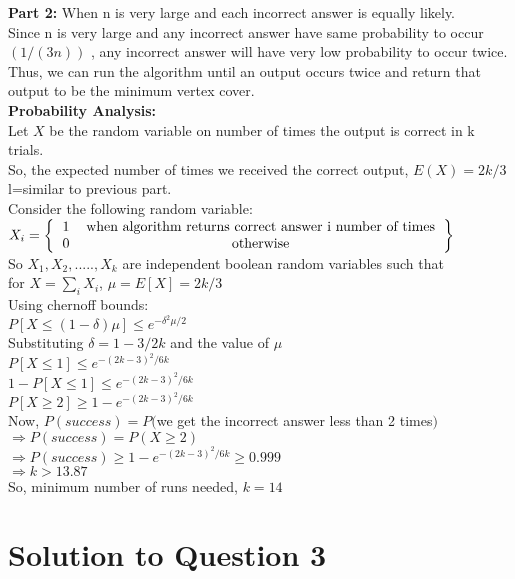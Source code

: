 \documentclass[11pt]{article}
\begin{document}
	\textbf{Part 2:} When n is very large and each incorrect answer is equally likely. \\
	Since n is very large and any incorrect answer have same probability to occur $(1/(3n))$ , any incorrect answer will have very
	low probability to occur twice. Thus, we can run the algorithm until an output occurs twice and return that output to be the minimum 
	vertex cover. \\
	\textbf{Probability Analysis:} \\
	Let $X$ be the random variable on number of times the output is correct in k trials.\\
	So, the expected number of times we received the correct output, $E(X) = 2k/3$ l=similar to previous part.  \\
	Consider the following random variable: \\
	$X_i = \left \{
	\begin{tabular}{cc}
	1 & when algorithm returns correct answer i number of times \\
	0 & otherwise
	\end{tabular}
	\right \}$ \\
	So $X_1, X_2,.....,X_k$ are independent boolean random variables such that \\
	for $X = \sum_{i} X_i$, $\mu = E[X] = 2k/3$ \\
	Using chernoff bounds: \\
	$P[X \leq (1-\delta)\mu] \leq e^{-\delta^2 \mu/2}$ \\
	Substituting $\delta = 1-3/2k$ and the value of $\mu$ \\
	$P[X \leq 1] \leq e^{-(2k-3)^2/6k}$ \\
	$1 - P[X \leq 1] \leq e^{-(2k-3)^2/6k}$ \\
	$P[X \geq 2] \geq 1 - e^{-(2k-3)^2/6k}$ \\
	Now, $P(success) = P($we get the incorrect answer less than 2 times$)$ \\
	$\Rightarrow P(success) = P(X \geq 2)$ \\
	$\Rightarrow P(success) \geq 1 - e^{-(2k-3)^2/6k} \geq 0.999$ \\
	$\Rightarrow k > 13.87$ \\
	So, minimum number of runs needed, $k = 14$
	
	 
	
	\section{Solution to Question 3}
	
\end{document}
